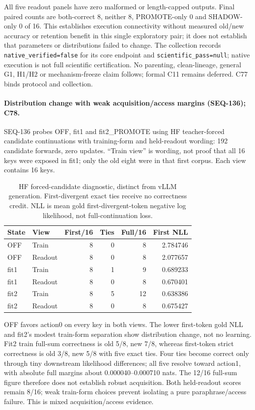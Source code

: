 \documentclass{article}
\begin{document}
All five readout panels have zero malformed or length-capped outputs. Final
paired counts are both-correct 8, neither 8, PROMOTE-only 0 and SHADOW-only 0 of 16.
This establishes execution connectivity without measured old/new accuracy or
retention benefit in this single exploratory pair; it does not establish that
parameters or distributions failed to change. The collection records
\texttt{native\_verified=false} for its core endpoint and
\texttt{scientific\_pass=null}; native execution is not full scientific
certification. No parenting, clean-lineage, general G1, H1/H2 or mechanism-freeze
claim follows; formal C11 remains deferred. C77 binds protocol and collection.

\paragraph{Distribution change with weak acquisition/access margins (SEQ-136); C78.}
SEQ-136 probes OFF, fit1 and fit2\_PROMOTE using HF teacher-forced candidate
continuations with training-form and held-readout wording: 192 candidate forwards,
zero updates. ``Train view'' is wording, not proof that all 16 keys were exposed
in fit1; only the old eight were in that first corpus. Each view contains 16 keys.

\begin{table}[ht]
\centering
\caption{HF forced-candidate diagnostic, distinct from vLLM generation.
First-divergent exact ties receive no correctness credit. NLL is mean gold
first-divergent-token negative log likelihood, not full-continuation loss.}
\begin{tabular}{llrrrr}
\toprule
State & View & First/16 & Ties & Full/16 & First NLL \\
\midrule
OFF & Train & 8 & 0 & 8 & 2.784746 \\
OFF & Readout & 8 & 0 & 8 & 2.077657 \\
fit1 & Train & 8 & 1 & 9 & 0.689233 \\
fit1 & Readout & 8 & 0 & 8 & 0.670401 \\
fit2 & Train & 8 & 5 & 12 & 0.638386 \\
fit2 & Readout & 8 & 0 & 8 & 0.675427 \\
\bottomrule
\end{tabular}
\end{table}

OFF favors action0 on every key in both views. The lower first-token gold NLL
and fit2's modest train-form separation show distribution change, not no
learning. Fit2 train full-sum correctness is old 5/8, new 7/8, whereas first-token
strict correctness is old 3/8, new 5/8 with five exact ties. Four ties become
correct only through tiny downstream likelihood differences; all five resolve
toward action1, with absolute full margins about 0.000040--0.000710 nats. The
12/16 full-sum figure therefore does not establish robust acquisition. Both
held-readout scores remain 8/16; weak train-form choices prevent isolating a
pure paraphrase/access failure. This is mixed acquisition/access evidence.
\end{document}
